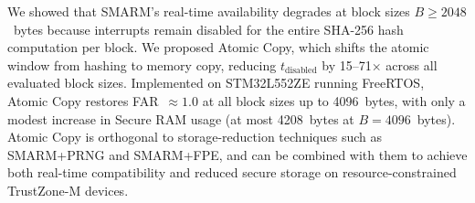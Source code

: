 \documentclass[conference]{IEEEtran}
\newcommand{\tdis}{$t_{\mathrm{disabled}}$\xspace}
\begin{document}
We showed that SMARM's real-time availability degrades at block
sizes $B \geq 2048$~bytes because interrupts remain disabled for
the entire SHA-256 hash computation per block. We proposed Atomic
Copy, which shifts the atomic window from hashing to memory copy,
reducing \tdis by 15--71$\times$ across all evaluated block sizes.
Implemented on STM32L552ZE running FreeRTOS, Atomic Copy restores
FAR~$\approx 1.0$ at all block sizes up to 4096~bytes, with only a
modest increase in Secure RAM usage (at most 4208~bytes at
$B = 4096$~bytes). Atomic Copy is orthogonal to storage-reduction
techniques such as SMARM+PRNG and SMARM+FPE, and can be combined
with them to achieve both real-time compatibility and reduced secure
storage on resource-constrained TrustZone-M devices.
 


 
\end{document}
